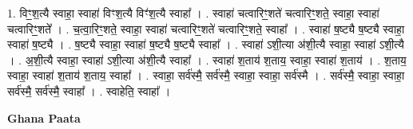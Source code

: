 \documentclass[17pt]{extarticle}
\begin{document}
1. विꣳ॒॒श॒त्यै स्वाहा॒ स्वाहा॑ विꣳश॒त्यै विꣳ॑श॒त्यै स्वाहा᳚ । . स्वाहा॑ चत्वारिꣳ॒॒शते॑ चत्वारिꣳ॒॒शते॒ स्वाहा॒ स्वाहा॑ चत्वारिꣳ॒॒शते᳚ । . च॒त्वा॒रिꣳ॒॒शते॒ स्वाहा॒ स्वाहा॑ चत्वारिꣳ॒॒शते॑ चत्वारिꣳ॒॒शते॒ स्वाहा᳚ । . स्वाहा॑ ष॒ष्ट्यै ष॒ष्ट्यै स्वाहा॒ स्वाहा॑ ष॒ष्ट्यै । . ष॒ष्ट्यै स्वाहा॒ स्वाहा॑ ष॒ष्ट्यै ष॒ष्ट्यै स्वाहा᳚ । . स्वाहा॑ ऽशी॒त्या अ॑शी॒त्यै स्वाहा॒ स्वाहा॑ ऽशी॒त्यै । . अ॒शी॒त्यै स्वाहा॒ स्वाहा॑ ऽशी॒त्या अ॑शी॒त्यै स्वाहा᳚ । . स्वाहा॑ श॒ताय॑ श॒ताय॒ स्वाहा॒ स्वाहा॑ श॒ताय॑ । . श॒ताय॒ स्वाहा॒ स्वाहा॑ श॒ताय॑ श॒ताय॒ स्वाहा᳚ । . स्वाहा॒ सर्व॑स्मै॒ सर्व॑स्मै॒ स्वाहा॒ स्वाहा॒ सर्व॑स्मै । . सर्व॑स्मै॒ स्वाहा॒ स्वाहा॒ सर्व॑स्मै॒ सर्व॑स्मै॒ स्वाहा᳚ । . स्वाहेति॒ स्वाहा᳚ । \newline

\textbf{Ghana Paata } \newline
\end{document}
